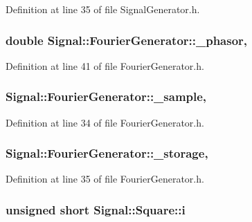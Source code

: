 Definition at line 35 of file Signal\+Generator.\+h.

\hypertarget{classSignal_1_1FourierGenerator_a72d24f45a30cd143508ce7eb753f4436}{
\subsubsection[{\+\_\+phasor}]{\setlength{\rightskip}{0pt plus 5cm}double Signal\+::\+Fourier\+Generator\+::\+\_\+phasor\hspace{0.3cm}{\ttfamily [protected]}, {\ttfamily [inherited]}}}\label{classSignal_1_1FourierGenerator_a72d24f45a30cd143508ce7eb753f4436}


Definition at line 41 of file Fourier\+Generator.\+h.

\hypertarget{classSignal_1_1FourierGenerator_a78c37a66bf33a2fda3c9e92478ad418c}{
\subsubsection[{\+\_\+sample}]{ Signal\+::\+Fourier\+Generator\+::\+\_\+sample\hspace{0.3cm}{\ttfamily [protected]}, {\ttfamily [inherited]}}}\label{classSignal_1_1FourierGenerator_a78c37a66bf33a2fda3c9e92478ad418c}


Definition at line 34 of file Fourier\+Generator.\+h.

\hypertarget{classSignal_1_1FourierGenerator_af7ad42ccb202fba6c0fb1ec653c5cb36}{
\subsubsection[{\+\_\+storage}]{ Signal\+::\+Fourier\+Generator\+::\+\_\+storage\hspace{0.3cm}{\ttfamily [protected]}, {\ttfamily [inherited]}}}\label{classSignal_1_1FourierGenerator_af7ad42ccb202fba6c0fb1ec653c5cb36}


Definition at line 35 of file Fourier\+Generator.\+h.

\hypertarget{classSignal_1_1Square_a3170f60bd41cbd43c861a63e0a5ae31d}{
\subsubsection[{i}]{\setlength{\rightskip}{0pt plus 5cm}unsigned short Signal\+::\+Square\+::i\hspace{0.3cm}{\ttfamily [protected]}}}\label{classSignal_1_1Square_a3170f60bd41cbd43c861a63e0a5ae31d}


